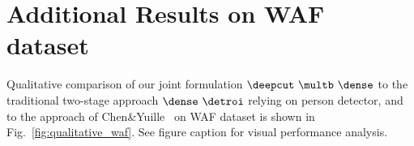 \section{Additional Results on WAF dataset}
\label{sec:supplemental:waf}
Qualitative comparison of our joint formulation
$\deepcut~\multb~\dense$ to the traditional two-stage approach
$\dense~\detroi$ relying on person detector, and to the approach of
Chen\&Yuille~\cite{Chen:2015:POC} on WAF dataset is shown in
Fig.~\ref{fig:qualitative_waf}. See figure caption for visual
performance analysis. 
